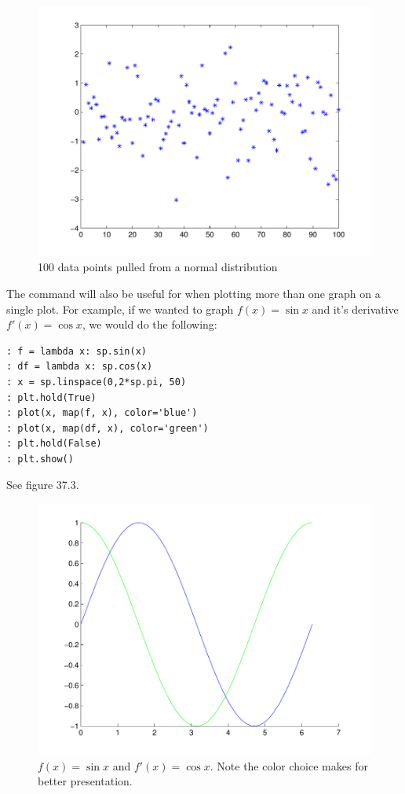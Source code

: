 \begin{figure}
\begin{center}
\includegraphics[scale=0.5]{./FiguresMAT/plot3}
\caption{100 data points pulled from a normal distribution}
\end{center}
\end{figure}

The  command will also be useful for when plotting more than one graph on a single plot.  For example, if we wanted to graph $f(x) = \sin{x}$ and it's derivative $f'(x) = \cos{x}$, we would do the following:

\begin{lstlisting}[style=python]
: f = lambda x: sp.sin(x)
: df = lambda x: sp.cos(x)
: x = sp.linspace(0,2*sp.pi, 50)
: plt.hold(True)
: plot(x, map(f, x), color='blue')
: plot(x, map(df, x), color='green')
: plt.hold(False)
: plt.show()
\end{lstlisting}

See figure 37.3.

\begin{figure}
\begin{center}
\includegraphics[scale=0.5]{./FiguresMAT/plot2}
\caption{$f(x) = \sin{x}$ and $f'(x) = \cos{x}$. Note the color choice makes for better presentation.}
\end{center}
\end{figure}

